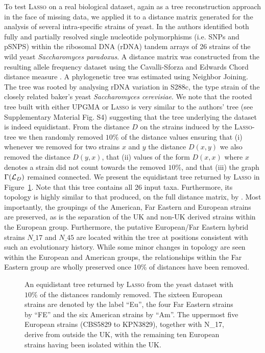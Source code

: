 To test \textsc{Lasso} on a real biological dataset, again as a tree
reconstruction approach in the face of missing data, we applied it to a
distance matrix generated for the analysis of several intra-specific strains
of yeast.  In \cite{west14ribosomal} the authors identified both fully and partially
resolved single nucleotide polymorphisms (i.e. SNPs and pSNPS) within the
ribosomal DNA (rDNA) tandem arrays of 26 strains of the wild yeast
\textit{Saccharomyces paradoxus}.  A distance matrix was constructed from the
resulting allele frequency dataset using the Cavalli-Sforza and Edwards Chord
distance measure \cite{cavalli}.  A phylogenetic tree was estimated using
Neighbor Joining.  The tree was rooted by analysing rDNA variation in S288c,
the type strain of the closely related baker's yeast \textit{Saccharomyces
  cerevisiae}.  We note that the rooted tree built with either \textsc{UPGMA}
or \textsc{Lasso} is very similar to the authors' tree (see Supplementary
Material Fig. S4) suggesting that the tree underlying the dataset is indeed
equidistant. From the distance $D$ on the strains induced by the
\textsc{Lasso}-tree we then randomly removed $10\%$ of the distance values
ensuring that (i) whenever we removed for two strains $x$ and $y$ the distance
$D(x,y)$ we also removed the distance $D(y,x)$, that (ii) values of the form
$D(x,x)$ where $x$ denotes a strain did not count towards the removed $10\%$,
and that (iii) the graph $\Gamma(\cL_D)$ remained connected. We present the
equidistant tree returned by \textsc{Lasso} in
Figure~\ref{fig:yeast-tree-complete}.  Note that this tree contains all 26
input taxa. Furthermore, its topology is highly similar to that produced, on
the full distance matrix, by \cite{west14ribosomal}. Most importantly, the groupings
of the American, Far Eastern and European strains are preserved, as is the
separation of the UK and non-UK derived strains within the European
group. Furthermore, the putative European/Far Eastern hybrid strains $N\_17$
and $N\_45$ are located within the tree at positions consistent with such an
evolutionary history. While some minor changes in topology are seen within the
European and American groups, the relationships within the Far Eastern group
are wholly preserved once 10\% of distances have been removed.

\begin{figure}
  \centering
  \begin{tikzpicture}[xscale=50,yscale=0.35]
    
  \end{tikzpicture}
  \endpgfgraphicnamed
  \caption{An equidistant tree returned by \textsc{Lasso} from the yeast
    dataset with $10\%$ of the distances randomly removed. The sixteen
    European strains are denoted by the label ``Eu'', the four Far Eastern
    strains by ``FE'' and the six American strains by ``Am''. The uppermost
    five European strains (CBS5829 to KPN3829), together with N\_17, derive
    from outside the UK, with the remaining ten European strains having been
    isolated within the UK.}
  \label{fig:yeast-tree-complete}
\end{figure}

